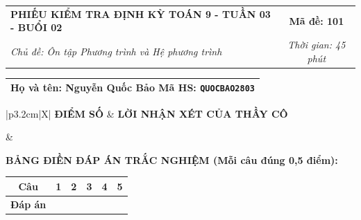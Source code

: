 \documentclass[12pt,a4paper]{article}
\begin{document}
\pagestyle{empty}



\noindent
\begin{tabularx}{\linewidth}{|X|c|}
\hline
\textbf{PHIẾU KIỂM TRA ĐỊNH KỲ TOÁN 9 - TUẦN 03 - BUỔI 02} & \textbf{Mã đề: 101} \\
\textit{Chủ đề: Ôn tập Phương trình và Hệ phương trình} & \textit{Thời gian: 45 phút} \\
\hline
\end{tabularx}

\vspace{1mm}

\noindent
\begin{tabularx}{\linewidth}{|X|}
\hline
\rule[-2mm]{0pt}{7.5mm}\textbf{Họ và tên:} \textbf{\large Nguyễn Quốc Bảo} \hfill \textbf{Mã HS:} \texttt{QUOCBAO2803} \quad \\
\hline
\end{tabularx}

\vspace{1mm}

\noindent
\begin{tabularx}{\linewidth}{|p{3.2cm}|X|}
\hline
\centering\textbf{ĐIỂM SỐ} & \centering\textbf{LỜI NHẬN XÉT CỦA THẦY CÔ} \tabularnewline
\hline
\rule{0pt}{1.3cm} & \tabularnewline
\hline
\end{tabularx}

\vspace{1.2mm}

\noindent\textbf{BẢNG ĐIỀN ĐÁP ÁN TRẮC NGHIỆM (Mỗi câu đúng 0,5 điểm):}
\vspace{0.8mm}

\noindent
\renewcommand{\arraystretch}{1.35}
\begin{tabularx}{\linewidth}{|c|*{5}{>{\centering\arraybackslash}X|}}
\hline
\textbf{Câu} & \textbf{1} & \textbf{2} & \textbf{3} & \textbf{4} & \textbf{5} \\
\hline
\textbf{Đáp án} & & & & & \\
\hline
\end{tabularx}
\renewcommand{\arraystretch}{1.0}

\vspace{1.5mm}
\end{document}
